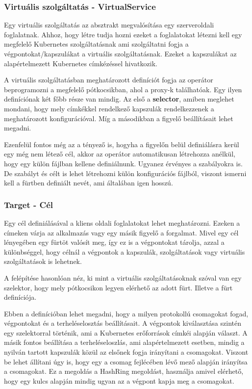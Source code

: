 \subsubsection{Virtuális szolgáltatás - VirtualService}

Egy virtuális szolgáltatás az absztrakt megvalósítása egy szerveroldali foglalatnak. 
Ahhoz, hogy létre tudja hozni ezeket a foglalatokat létezni kell egy megfelelő Kubernetes
szolgáltatásnak ami szolgáltatni fogja a végpontokat/kapszulákat a virtuális szolgáltatásnak.
Ezeket a kapszulákat az alapértelmezett Kubernetes címkézéssel hivatkozik. 

A virtuális szolgáltatásban meghatározott definíciót fogja az operátor beprogramozni a 
megfelelő pótkocsikban, ahol a proxy-k találhatóak. Egy ilyen definíciónak két főbb része
van mindig. Az első a \textbf{selector}, amiben meglehet mondani, hogy mely címkékkel
rendelkező kapszulák rendelkezzenek a meghatározott konfigurációval. Míg a másodikban 
a figyelő beállításait lehet megadni. 

Ezenfelül fontos még az a tényező is, hogyha a figyelőn belül definiálásra kerül egy
még nem létező cél, akkor az operátor automatikusan létrehozza anélkül, hogy egy 
külön fájlban kellene definiálnunk. Ugyanez érvényes a szabályokra is. De szabályt 
és célt is lehet létrehozni külön konfigurációs fájlból, viszont ismerni kell 
a fürtben definiált nevét, ami általában igen hosszú.

\subsubsection{Target - Cél}

Egy cél definiálásával a kliens oldali foglalatokat lehet meghatározni. Ezeken 
a címeken várja az alkalmazás vagy egy másik figyelő a forgalmat. Mivel egy cél 
lényegében egy fürtöt valósít meg, így ez is a végpontokat tárolja, azzal a különbséggel,
hogy célnál a végpontok a kapszulák, szolgáltatások vagy virtuális szolgáltatások is 
lehetnek. 

A felépítése hasonlóan néz, ki mint a virtuális szolgáltatásoknak szóval van egy 
szelektor, hogy mely pótkocsikon legyen elérhető az adott fürt. Illetve a fürt
definíciója. 

Ebben a definícióban lehet megadni, hogy a milyen protokollú csomagokat fogad, végpontokat
és a terheléselosztás beállításait. A végpontok kiválasztása szintén egy szelektorral
történik, ami a Kubernetes erőforrások címkéi alapján választ. A másik fontos beállítása
a terheléseloszlás, ami alapértelmezett esetben, mindig a nyilván tartott kapszulák 
közül az elsőnek fogja irányítani a csomagokat. Viszont be lehet állítani úgy is, hogy
egy a csomag fejlécében lévő mező alapján irányítsa a csomagokat. Ez a megoldás a
HashRing megoldást, használja amivel elérhető, hogy egy kulcs alapján mindig ugyan az
a végpont kapja meg a csomagokat. 


